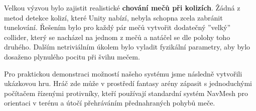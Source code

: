 Velkou výzvou bylo zajistit realistické \textbf{chování mečů při kolizích}. Žádná z metod detekce kolizí, které Unity nabízí, nebyla schopna zcela zabránit tunelování. Řešením bylo pro každý pár mečů vytvořit dodatečný ''velký'' collider, který se nacházel na jednom z mečů a natáčel se dle polohy toho druhého. Dalším netriviálním úkolem bylo vyladit fyzikální parametry, aby bylo dosaženo plynulého pocitu při švihu mečem. 

Pro praktickou demonstraci možností našeho systému jsme následně vytvořili ukázkovou hru. Hráč zde může v prostředí fantasy arény zápasit s jednoduchými počítačem řízenými protivníky, kteří používají standardní systém NavMesh pro orientaci v terénu a útočí přehráváním přednahraných pohybů meče. 
